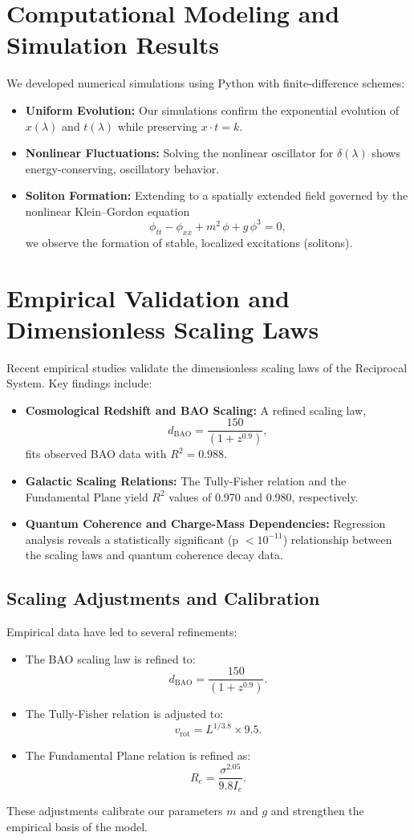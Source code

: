 \documentclass{article}
\begin{document}
\section{Computational Modeling and Simulation Results}
We developed numerical simulations using Python with finite-difference schemes:
\begin{itemize}
    \item \textbf{Uniform Evolution:} Our simulations confirm the exponential evolution of \( x(\lambda) \) and \( t(\lambda) \) while preserving \( x \cdot t = k \).
    \item \textbf{Nonlinear Fluctuations:} Solving the nonlinear oscillator for \( \delta(\lambda) \) shows energy-conserving, oscillatory behavior.
    \item \textbf{Soliton Formation:} Extending to a spatially extended field governed by the nonlinear Klein--Gordon equation
    \[
    \phi_{tt} - \phi_{xx} + m^2\,\phi + g\,\phi^3 = 0,
    \]
    we observe the formation of stable, localized excitations (solitons).
\end{itemize}

\section{Empirical Validation and Dimensionless Scaling Laws}
Recent empirical studies validate the dimensionless scaling laws of the Reciprocal System. Key findings include:
\begin{itemize}
    \item \textbf{Cosmological Redshift and BAO Scaling:}  
    A refined scaling law,
    \[
    d_{\text{BAO}} = \frac{150}{(1+z^{0.9})},
    \]
    fits observed BAO data with \( R^2 = 0.988 \).
    
    \item \textbf{Galactic Scaling Relations:}  
    The Tully-Fisher relation and the Fundamental Plane yield \( R^2 \) values of 0.970 and 0.980, respectively.
    
    \item \textbf{Quantum Coherence and Charge-Mass Dependencies:}  
    Regression analysis reveals a statistically significant (p \(< 10^{-11}\)) relationship between the scaling laws and quantum coherence decay data.
\end{itemize}

\subsection{Scaling Adjustments and Calibration}
Empirical data have led to several refinements:
\begin{itemize}
    \item The BAO scaling law is refined to:
    \[
    d_{\text{BAO}} = \frac{150}{(1+z^{0.9})}.
    \]
    \item The Tully-Fisher relation is adjusted to:
    \[
    v_{\text{rot}} = L^{1/3.8} \times 9.5.
    \]
    \item The Fundamental Plane relation is refined as:
    \[
    R_e = \frac{\sigma^{2.05}}{9.8 I_e}.
    \]
\end{itemize}
These adjustments calibrate our parameters \( m \) and \( g \) and strengthen the empirical basis of the model.
\end{document}
